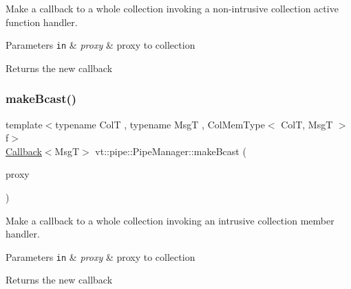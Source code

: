 Make a callback to a whole collection invoking a non-\/intrusive collection active function handler. 


\begin{DoxyParams}[1]{Parameters}
\mbox{\tt in}  & {\em proxy} & proxy to collection\\
\hline
\end{DoxyParams}
\begin{DoxyReturn}{Returns}
the new callback 
\end{DoxyReturn}
\mbox{\label{structvt_1_1pipe_1_1_pipe_manager_a6fb7d87f8beb2c1e80d492df47036158}} 
\subsubsection{\texorpdfstring{make\+Bcast()}{makeBcast()}\hspace{0.1cm}{\footnotesize\ttfamily [6/7]}}
{\footnotesize\ttfamily template$<$typename ColT , typename MsgT , Col\+Mem\+Type$<$ Col\+T, Msg\+T $>$ f$>$ \\
\hyperlink{namespacevt_a57b238783d05de96bc2c4027f7073b7f}{Callback}$<$MsgT$>$ vt\+::pipe\+::\+Pipe\+Manager\+::make\+Bcast (\begin{DoxyParamCaption}\item[{\hyperlink{structvt_1_1pipe_1_1_pipe_manager_t_l_af56c58cad882496e35f01227d4da3898}{Col\+Proxy\+Type}$<$ ColT $>$}]{proxy }\end{DoxyParamCaption})}



Make a callback to a whole collection invoking an intrusive collection member handler. 


\begin{DoxyParams}[1]{Parameters}
\mbox{\tt in}  & {\em proxy} & proxy to collection\\
\hline
\end{DoxyParams}
\begin{DoxyReturn}{Returns}
the new callback 
\end{DoxyReturn}
\mbox{\label{structvt_1_1pipe_1_1_pipe_manager_a4d561c17ce6861401a32892223e434c9}} 
